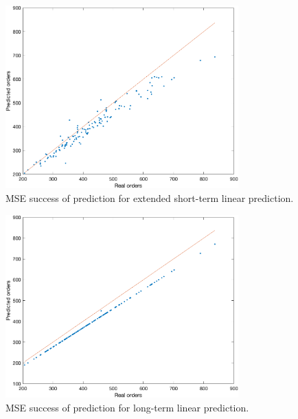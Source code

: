         \newpage
        \begin{figure}[!ht]
            \centering
            \includegraphics[width=0.8\textwidth]{figures/expCompELP.png}
            \caption{MSE success of prediction for extended short-term linear prediction.}
            \label{fig:eslpmse}
        \end{figure}
        \begin{figure}[!ht]
            \centering
            \includegraphics[width=0.8\textwidth]{figures/expCompELTLP.png}
            \caption{MSE success of prediction for long-term linear prediction.}
            \label{fig:eltlpmse}
        \end{figure}

